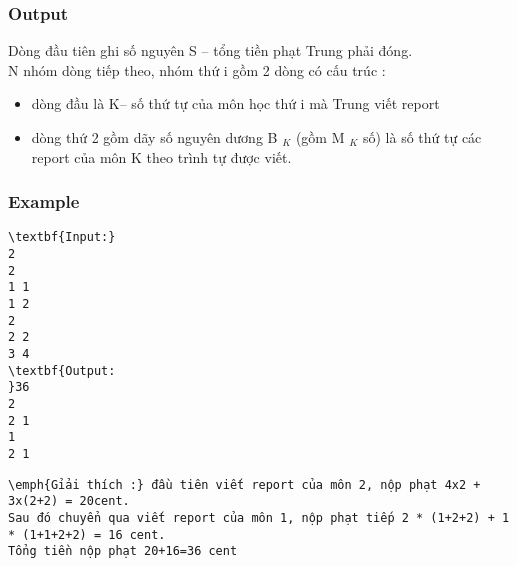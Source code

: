 \subsubsection{Output}

Dòng đầu tiên ghi số nguyên S – tổng tiền phạt Trung phải đóng.
\\N nhóm dòng tiếp theo, nhóm thứ i gồm 2 dòng có cấu trúc :
\begin{itemize}
	\item dòng đầu là K– số thứ tự của môn học thứ i mà Trung viết report
	\item dòng thứ 2 gồm dãy số nguyên dương B $_ K $ (gồm M $_ K $ số) là số thứ tự các report của môn K theo trình tự được viết.
\end{itemize}

\subsubsection{Example}
\begin{verbatim}
\textbf{Input:}
2
2
1 1
1 2
2
2 2
3 4
\textbf{Output:
}36
2
2 1
1
2 1\end{verbatim}
\begin{verbatim}
\emph{Gỉải thích :} đầu tiên viết report của môn 2, nộp phạt 4x2 + 3x(2+2) = 20cent.
Sau đó chuyển qua viết report của môn 1, nộp phạt tiếp 2 * (1+2+2) + 1 * (1+1+2+2) = 16 cent. 
Tổng tiền nộp phạt 20+16=36 cent
\end{verbatim}
